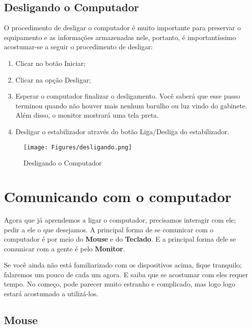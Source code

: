 \documentclass[hidelinks,12pt]{article}
\begin{document}
\subsection{Desligando o Computador}
\label{Desligando o Computador}

O procedimento de desligar o computador é muito importante para preservar o equipamento e as informações armazenadas nele, portanto, é importantíssimo acostumar-se a seguir o procedimento de desligar:

\begin{enumerate}
	\item Clicar no botão Iniciar;

	\item Clicar na opção Desligar;

	\item Esperar o computador finalizar o desligamento. Você saberá que esse passo terminou quando não houver mais nenhum barulho ou luz vindo do gabinete. Além disso, o monitor mostrará uma tela preta.

	\item Desligar o estabilizador através do botão Liga/Desliga do estabilizador.
\end{enumerate}

\begin{figure}[!h]
	\centering
	\texttt{[image: Figures/desligando.png]}
	\caption{Desligando o Computador}
	\label{fig:desligando}
\end{figure}

\newpage

\section{Comunicando com o computador}
\label{Comunicando com o computador}


Agora que já aprendemos a ligar o computador, precisamos interagir com ele; pedir a ele o que desejamos. A principal forma de se comunicar com o computador é por meio do \textbf{Mouse} e do \textbf{Teclado}. E a principal forma dele se comunicar com a gente é pelo \textbf{Monitor}.

Se você ainda não está familiarizado com os dispositivos acima, fique tranquilo; falaremos um pouco de cada um agora. E saiba que se acostumar com eles requer tempo. No começo, pode parecer muito estranho e complicado, mas logo logo estará acostumado a utilizá-los.

\subsection{Mouse}
\label{Mouse}
\end{document}

